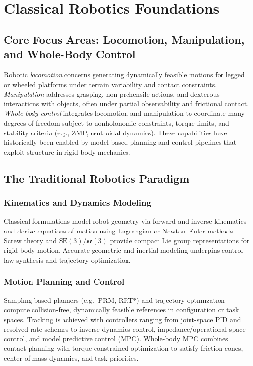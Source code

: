 \section{Classical Robotics Foundations}
\label{sec:classical}

\subsection{Core Focus Areas: Locomotion, Manipulation, and Whole-Body Control}
Robotic \emph{locomotion} concerns generating dynamically feasible motions for legged or wheeled platforms under terrain variability and contact constraints. \emph{Manipulation} addresses grasping, non-prehensile actions, and dexterous interactions with objects, often under partial observability and frictional contact. \emph{Whole-body control} integrates locomotion and manipulation to coordinate many degrees of freedom subject to nonholonomic constraints, torque limits, and stability criteria (e.g., ZMP, centroidal dynamics). These capabilities have historically been enabled by model-based planning and control pipelines that exploit structure in rigid-body mechanics.

\subsection{The Traditional Robotics Paradigm}
\subsubsection{Kinematics and Dynamics Modeling}
Classical formulations model robot geometry via forward and inverse kinematics and derive equations of motion using Lagrangian or Newton–Euler methods. Screw theory and \(\mathrm{SE}(3)\)/\(\mathfrak{se}(3)\) provide compact Lie group representations for rigid-body motion. Accurate geometric and inertial modeling underpins control law synthesis and trajectory optimization.

\subsubsection{Motion Planning and Control}
Sampling-based planners (e.g., PRM, RRT*) and trajectory optimization compute collision-free, dynamically feasible references in configuration or task spaces. Tracking is achieved with controllers ranging from joint-space PID and resolved-rate schemes to inverse-dynamics control, impedance/operational-space control, and model predictive control (MPC). Whole-body MPC combines contact planning with torque-constrained optimization to satisfy friction cones, center-of-mass dynamics, and task priorities.

